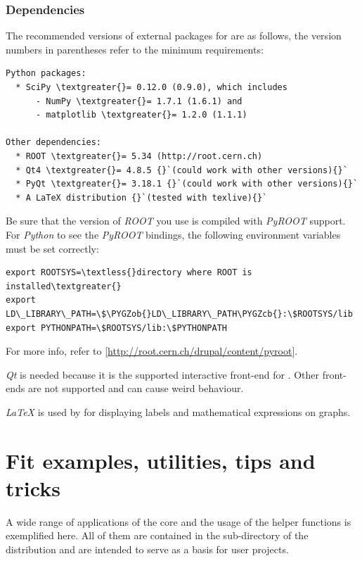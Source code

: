 \documentclass[a4paper,10pt,english]{sphinxmanual}
\def\PYGZob{\char`\{}
\def\PYGZcb{\char`\}}
\begin{document}
\subsection{Dependencies}
\label{index:dependencies}
The recommended versions of external packages for  are as follows,
the version numbers in parentheses refer to the minimum requirements:

\begin{Verbatim}[commandchars=\\\{\}]
Python packages:
  * SciPy \textgreater{}= 0.12.0 (0.9.0), which includes
      - NumPy \textgreater{}= 1.7.1 (1.6.1) and
      - matplotlib \textgreater{}= 1.2.0 (1.1.1)

Other dependencies:
  * ROOT \textgreater{}= 5.34 (http://root.cern.ch)
  * Qt4 \textgreater{}= 4.8.5 {}`(could work with other versions){}`
  * PyQt \textgreater{}= 3.18.1 {}`(could work with other versions){}`
  * A LaTeX distribution {}`(tested with texlive){}`
\end{Verbatim}

Be sure that the version of \emph{ROOT} you use is compiled with \emph{PyROOT} support.
For \emph{Python} to see the \emph{PyROOT} bindings, the following environment variables
must be set correctly:

\begin{Verbatim}[commandchars=\\\{\}]
export ROOTSYS=\textless{}directory where ROOT is installed\textgreater{}
export LD\_LIBRARY\_PATH=\$\PYGZob{}LD\_LIBRARY\_PATH\PYGZcb{}:\$ROOTSYS/lib
export PYTHONPATH=\$ROOTSYS/lib:\$PYTHONPATH
\end{Verbatim}

For more info, refer to {[}\href{http://root.cern.ch/drupal/content/pyroot}{http://root.cern.ch/drupal/content/pyroot}{]}.

\emph{Qt} is needed because it is the supported interactive front-end for
. Other front-ends are not supported and can cause weird behaviour.

\emph{LaTeX} is used by  for displaying labels and mathematical
expressions on graphs.


\chapter{Fit examples, utilities, tips and tricks}
\label{index:fit-examples-utilities-tips-and-tricks}
A wide range of applications of the  core and the usage of
the helper functions is exemplified here. All of them
are contained in the sub-directory  of the
 distribution and are intended to serve as a basis for
user projects.
\end{document}
